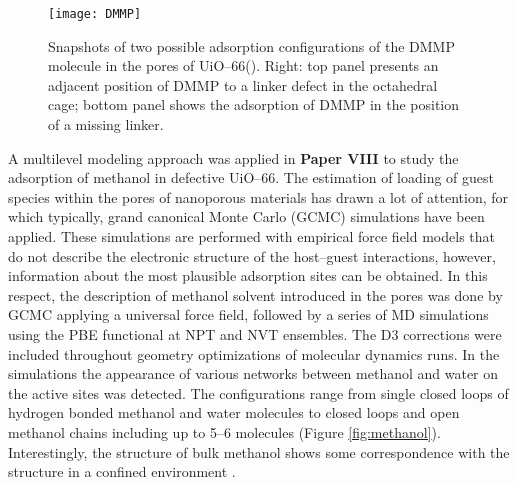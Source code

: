 \begin{figure}[!h]
	\centering
	\texttt{[image: DMMP]}
	\caption{Snapshots of two possible adsorption configurations of the DMMP
	molecule in the pores of UiO--66(). Right: top panel
	presents an adjacent position of DMMP to a
linker defect in the octahedral cage; bottom panel shows the
	adsorption of DMMP in the position of a missing linker.}
	\label{fig:DMMP}
\end{figure}
\npar
\newpage
A multilevel modeling approach was
applied in \textbf{Paper VIII} to study the adsorption of methanol in
defective UiO--66. The estimation of loading of guest species within the pores
of nanoporous materials has drawn a lot of attention, for which typically, grand
canonical Monte Carlo (GCMC) simulations have been applied. These simulations
are performed with empirical force field models that do not describe the
electronic structure of the host--guest interactions, however, information
about the most plausible adsorption sites can be obtained. In this respect, the
description of methanol solvent introduced in the pores was done by GCMC
applying a universal force field, followed by a series of MD simulations using
the PBE functional at NPT and NVT ensembles. The D3 corrections were included
throughout geometry optimizations of molecular dynamics runs. In the simulations the appearance of various networks between methanol and water on the active
sites was detected. The configurations range from single closed loops of
hydrogen bonded methanol and water molecules to closed loops and open
methanol chains including up to 5--6 molecules (Figure
\ref{fig:methanol}). Interestingly, the structure of bulk methanol shows
some correspondence with the structure in a confined environment
\cite{Caratelli2017a}.

